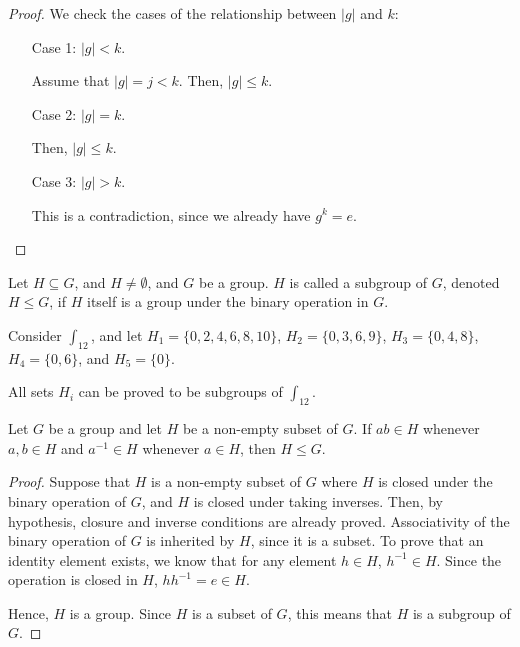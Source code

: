     \begin{proof}
        We check the cases of the relationship between \(|g|\) and \(k\):
        \begin{enumerate}
            \item[Case 1:] \(|g| < k\).

            Assume that \(|g| = j < k\). Then, \(|g| \leq k\). 

            \item[Case 2:] \(|g| = k\). 

            Then, \(|g| \leq k\). 

            \item[Case 3:] \(|g| > k\).

            This is a contradiction, since we already have \(g^k = e\). 
        \end{enumerate}
    \end{proof}

    \begin{dfn}[Subgroup]
        Let \(H \subseteq G\), and \(H \neq \emptyset\), and \(G\) be a group. \(H\) is called a subgroup of \(G\), denoted \(H \leq G\), if \(H\) itself is a group under the binary operation in \(G\).
    \end{dfn}

    \begin{example}
        Consider \(\int_{12}\), and let \(H_1 = \{0, 2, 4, 6, 8, 10\}\), \(H_2 = \{0, 3, 6, 9\}\), \(H_3 = \{0, 4, 8\}\), \(H_4 = \{0, 6\}\), and \(H_5 = \{0\}\).

        All sets \(H_i\) can be proved to be subgroups of \(\int_{12}\).
    \end{example}

    \begin{thm}
        Let \(G\) be a group and let \(H\) be a non-empty subset of \(G\). If \(ab\in H\) whenever \(a,b\in H\) and \(a^{-1}\in H\) whenever \(a\in H\), then \(H \leq G\).
    \end{thm}

    \begin{proof}
        Suppose that \(H\) is a non-empty subset of \(G\) where \(H\) is closed under the binary operation of \(G\), and \(H\) is closed under taking inverses. Then, by hypothesis, closure and inverse conditions are already proved. Associativity of the binary operation of \(G\) is inherited by \(H\), since it is a subset. To prove that an identity element exists, we know that for any element \(h\in H\), \(h^{-1}\in H\). Since the operation is closed in \(H\), \(hh^{-1} = e\in H\).

        Hence, \(H\) is a group. Since \(H\) is a subset of \(G\), this means that \(H\) is a subgroup of \(G\).
    \end{proof}

